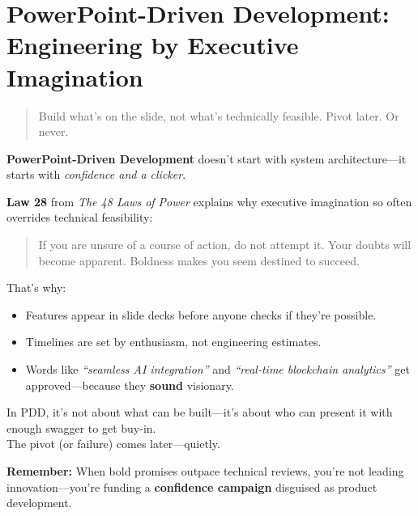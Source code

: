 \section{PowerPoint-Driven Development: Engineering by Executive Imagination}

\begin{quote}
Build what's on the slide, not what’s technically feasible. Pivot later. Or never.
\end{quote}

  \textbf{PowerPoint-Driven Development} doesn’t start with system architecture—it starts with \textit{confidence and a clicker}.
  
  \medskip
  
  \textbf{Law 28} from \textit{The 48 Laws of Power} explains why executive imagination so often overrides technical feasibility:
  \begin{quote}
  If you are unsure of a course of action, do not attempt it. Your doubts will become apparent. Boldness makes you 
  seem destined to succeed.
  \end{quote}
  
  \medskip
  
  That’s why:
  \begin{itemize}
    \item Features appear in slide decks before anyone checks if they’re possible.
    \item Timelines are set by enthusiasm, not engineering estimates.
    \item Words like \textit{``seamless AI integration''} and \textit{``real-time blockchain analytics''} get approved—because they \textbf{sound} visionary.
  \end{itemize}
  
  \medskip
  
  In PDD, it’s not about what can be built—it’s about who can present it with enough swagger to get buy-in. \\
  The pivot (or failure) comes later—quietly.
  
  \medskip
  
  \textbf{Remember:} When bold promises outpace technical reviews, you’re not leading innovation—you’re funding a \textbf{confidence campaign} disguised as product development.
  
  



